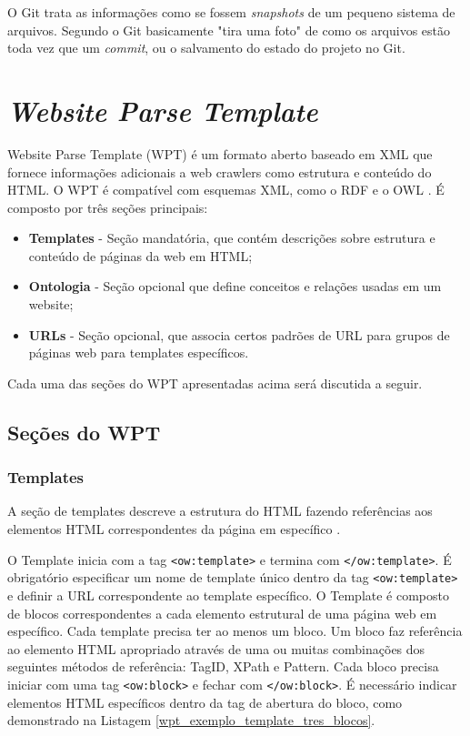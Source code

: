 O Git trata as informações como se fossem \emph{snapshots} de um pequeno sistema de arquivos. Segundo \cite[p. 6]{progit} o Git basicamente "tira uma foto" de como os arquivos estão toda vez que um \emph{commit}, ou o salvamento do estado do projeto no Git.

\pagebreak

\section{\emph{Website Parse Template}}


Website Parse Template (WPT) é um formato aberto baseado em XML que fornece informações adicionais a web crawlers como estrutura e conteúdo do HTML. O WPT é compatível com esquemas XML, como o RDF e o OWL \cite{wpt}. É composto por três seções principais:

\begin{itemize}
	\item \textbf{Templates} - Seção mandatória, que contém descrições sobre estrutura e conteúdo de páginas da web em HTML;
	\item \textbf{Ontologia} - Seção opcional que define conceitos e relações usadas em um website;
	\item \textbf{URLs} - Seção opcional, que associa certos padrões de URL para grupos de páginas web para templates específicos. 
\end{itemize}

Cada uma das seções do WPT apresentadas acima será discutida a seguir.

\subsection{Seções do WPT}

\subsubsection{Templates}

A seção de templates descreve a estrutura do HTML fazendo referências aos elementos HTML correspondentes da página em específico \cite{wpt}.

O Template inicia com a tag \texttt{<ow:template>} e termina com  \texttt{</ow:template>}. É obrigatório especificar um nome de template único dentro da tag \texttt{<ow:template>} e definir a URL correspondente ao template específico. O Template é composto de blocos correspondentes a cada elemento estrutural de uma página web em específico. Cada template precisa ter ao menos um bloco. Um bloco faz referência ao elemento HTML apropriado através de uma ou muitas combinações dos seguintes métodos de referência: TagID, XPath e Pattern. Cada bloco precisa iniciar com uma tag \texttt{<ow:block>} e fechar com \texttt{</ow:block>}. É necessário indicar elementos HTML específicos dentro da tag de abertura do bloco, como demonstrado na Listagem \ref{wpt_exemplo_template_tres_blocos}.

